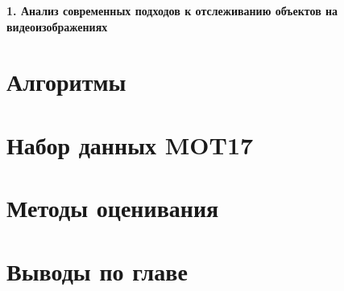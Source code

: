 \newpage
\begin{flushleft}
  \textbf{\large 1. Анализ современных подходов к отслеживанию объектов на видеоизображениях}
\end{flushleft}

\section{Алгоритмы}

\section{Набор данных MOT17}

\section{Методы оценивания}

\section{Выводы по главе}
